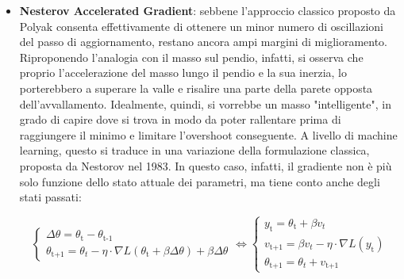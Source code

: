 \begin{itemize}
            \begin{equation}
                \begin{cases}
                    v_{\text{t+1}} = \beta \, v_{\text{t}} + \nabla L(\theta_{\text{t}}) \\[0.35cm]
                    \theta_{\text{t+1}} = \theta_{\text{t}} - \eta \cdot v_{\text{t+1}}
                \end{cases}
                \label{eq:momentum_pytorch}
            \end{equation}

        \item \textbf{Nesterov Accelerated Gradient}: sebbene l'approccio classico proposto da Polyak consenta effettivamente di ottenere un minor numero di oscillazioni del passo di aggiornamento, restano ancora ampi margini di miglioramento. Riproponendo l'analogia con il masso sul pendio, infatti, si osserva che proprio l'accelerazione del masso lungo il pendio e la sua inerzia, lo porterebbero a superare la valle e risalire una parte della parete opposta dell'avvallamento. Idealmente, quindi, si vorrebbe un masso "intelligente", in grado di capire dove si trova in modo da poter rallentare prima di raggiungere il minimo e limitare l'overshoot conseguente. A livello di machine learning, questo si traduce in una variazione della formulazione classica, proposta da Nestorov\cite{Nesterov} nel 1983. In questo caso, infatti, il gradiente non è più solo funzione dello stato attuale dei parametri, ma tiene conto anche degli stati passati: 
        
            \begin{equation}
                \begin{cases}
                    \Delta \theta = \theta_{\text{t}} - \theta_{\text{t-1}} \\[0.35cm]
                    \theta_{\text{t+1}} = \theta_{t} - \eta \cdot \nabla L(\theta_{\text{t}} + \beta \Delta \theta) + \beta \Delta \theta \end{cases}\iff \begin{cases}
                    y_{\text{t}} = \theta_{\text{t}} + \beta v_{t} \\[0.35cm]
                    v_{\text{t+1}} = \beta v_{t} - \eta \cdot \nabla L(y_{\text{t}}) \\[0.35cm]
                    \theta_{\text{t+1}} = \theta_{t} + v_{\text{t+1}}
                \end{cases}
                \label{eq:Nestorov}
            \end{equation}


\end{itemize}
